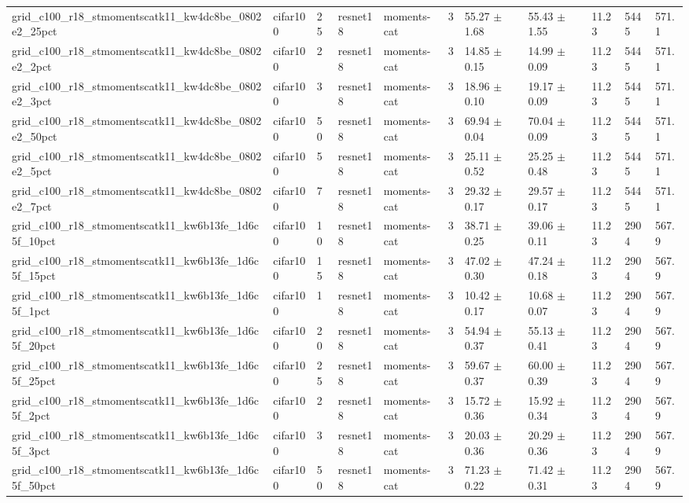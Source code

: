 \begin{tabular}{lllllllllll}
grid_c100_r18_stmomentscatk11_kw4dc8be_0802e2_25pct & cifar100 & 25 & resnet18 & moments-cat & 3 & 55.27 $\pm$ 1.68 & 55.43 $\pm$ 1.55 & 11.23 & 5445 & 571.1 \\
grid_c100_r18_stmomentscatk11_kw4dc8be_0802e2_2pct & cifar100 & 2 & resnet18 & moments-cat & 3 & 14.85 $\pm$ 0.15 & 14.99 $\pm$ 0.09 & 11.23 & 5445 & 571.1 \\
grid_c100_r18_stmomentscatk11_kw4dc8be_0802e2_3pct & cifar100 & 3 & resnet18 & moments-cat & 3 & 18.96 $\pm$ 0.10 & 19.17 $\pm$ 0.09 & 11.23 & 5445 & 571.1 \\
grid_c100_r18_stmomentscatk11_kw4dc8be_0802e2_50pct & cifar100 & 50 & resnet18 & moments-cat & 3 & 69.94 $\pm$ 0.04 & 70.04 $\pm$ 0.09 & 11.23 & 5445 & 571.1 \\
grid_c100_r18_stmomentscatk11_kw4dc8be_0802e2_5pct & cifar100 & 5 & resnet18 & moments-cat & 3 & 25.11 $\pm$ 0.52 & 25.25 $\pm$ 0.48 & 11.23 & 5445 & 571.1 \\
grid_c100_r18_stmomentscatk11_kw4dc8be_0802e2_7pct & cifar100 & 7 & resnet18 & moments-cat & 3 & 29.32 $\pm$ 0.17 & 29.57 $\pm$ 0.17 & 11.23 & 5445 & 571.1 \\
grid_c100_r18_stmomentscatk11_kw6b13fe_1d6c5f_10pct & cifar100 & 10 & resnet18 & moments-cat & 3 & 38.71 $\pm$ 0.25 & 39.06 $\pm$ 0.11 & 11.23 & 2904 & 567.9 \\
grid_c100_r18_stmomentscatk11_kw6b13fe_1d6c5f_15pct & cifar100 & 15 & resnet18 & moments-cat & 3 & 47.02 $\pm$ 0.30 & 47.24 $\pm$ 0.18 & 11.23 & 2904 & 567.9 \\
grid_c100_r18_stmomentscatk11_kw6b13fe_1d6c5f_1pct & cifar100 & 1 & resnet18 & moments-cat & 3 & 10.42 $\pm$ 0.17 & 10.68 $\pm$ 0.07 & 11.23 & 2904 & 567.9 \\
grid_c100_r18_stmomentscatk11_kw6b13fe_1d6c5f_20pct & cifar100 & 20 & resnet18 & moments-cat & 3 & 54.94 $\pm$ 0.37 & 55.13 $\pm$ 0.41 & 11.23 & 2904 & 567.9 \\
grid_c100_r18_stmomentscatk11_kw6b13fe_1d6c5f_25pct & cifar100 & 25 & resnet18 & moments-cat & 3 & 59.67 $\pm$ 0.37 & 60.00 $\pm$ 0.39 & 11.23 & 2904 & 567.9 \\
grid_c100_r18_stmomentscatk11_kw6b13fe_1d6c5f_2pct & cifar100 & 2 & resnet18 & moments-cat & 3 & 15.72 $\pm$ 0.36 & 15.92 $\pm$ 0.34 & 11.23 & 2904 & 567.9 \\
grid_c100_r18_stmomentscatk11_kw6b13fe_1d6c5f_3pct & cifar100 & 3 & resnet18 & moments-cat & 3 & 20.03 $\pm$ 0.36 & 20.29 $\pm$ 0.36 & 11.23 & 2904 & 567.9 \\
grid_c100_r18_stmomentscatk11_kw6b13fe_1d6c5f_50pct & cifar100 & 50 & resnet18 & moments-cat & 3 & 71.23 $\pm$ 0.22 & 71.42 $\pm$ 0.31 & 11.23 & 2904 & 567.9 \\

\end{tabular}
